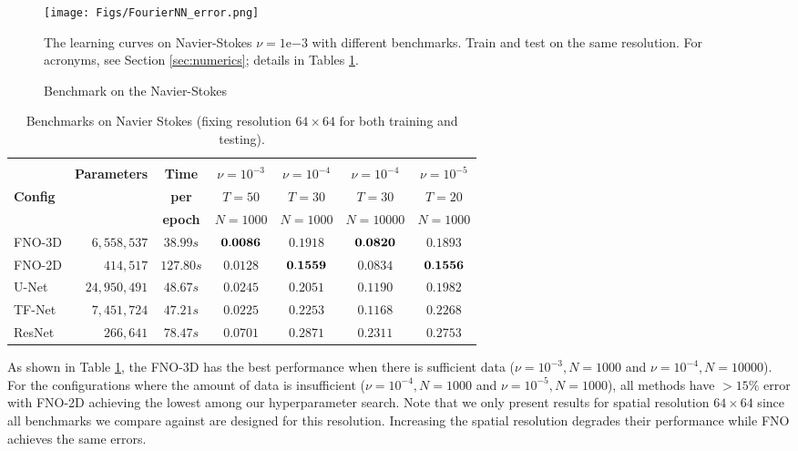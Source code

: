 \begin{figure}
    \centering
    \texttt{[image: Figs/FourierNN\_error.png]}
        \caption{Benchmark on the Navier-Stokes}
    \label{fig:ns-error}
    \small{The learning curves on Navier-Stokes $\nu=1\mathrm{e}{-3}$ with different benchmarks. Train and test on the same resolution.
    For acronyms, see Section \ref{sec:numerics}; details in Tables \ref{table:ns}.} 
\end{figure}

\begin{table}[ht]
\begin{center}
\begin{tabular}{l|rc|cccc}
\multicolumn{1}{c}{} 
&\multicolumn{1}{c}{}
&\multicolumn{1}{c}{} 
&\multicolumn{1}{c}{} 
&\multicolumn{1}{c}{}\\
 & {\bf Parameters}& {\bf Time}& $\nu=10^{-3}$ &$\nu=10^{-4}$ &$\nu=10^{-4}$ & $\nu=10^{-5}$\\
 {\bf Config}&& {\bf per} &$T=50$ &$T=30$ &$T=30$ & $T=20$\\
 && {\bf epoch} &$ N=1000$ &$ N=1000$ &$N=10000$ & $ N=1000$\\
\hline 
FNO-3D    & $6,558,537$ & $38.99s$ &${\bf 0.0086}$ &$0.1918$ &${\bf 0.0820}$  &$0.1893$ \\
FNO-2D    & $414,517$ & $127.80s$ &$0.0128 $ &${\bf 0.1559}$ &$0.0834$  &${\bf 0.1556}$ \\
U-Net       & $24,950,491$ & $48.67s$ &$0.0245 $ &$0.2051$ &$0.1190$  &$0.1982$ \\
TF-Net       & $7,451,724$ & $47.21s$ &$0.0225 $ &$0.2253$ &$0.1168$  &$0.2268$ \\
ResNet     &$266,641$ & $78.47s$ &$0.0701 $ &$0.2871$ &$0.2311$  &$0.2753$ \\
\hline 
\end{tabular}
\end{center}
\caption{Benchmarks on Navier Stokes (fixing resolution $64 \times 64$ for both training and testing).}
\label{table:ns}
\end{table}

As shown in Table \ref{table:ns}, the FNO-3D has the best performance when there is sufficient data ($\nu=10^{-3}, N=1000$ and $\nu=10^{-4}, N=10000$). For the configurations where the amount of data is insufficient ($\nu=10^{-4}, N=1000$ and $\nu=10^{-5}, N=1000$), all methods have $>15\%$ error with FNO-2D achieving the lowest among our hyperparameter search. Note that we only present results for spatial resolution $64 \times 64$ since all benchmarks we compare against are designed for this resolution. Increasing the spatial resolution degrades their performance while FNO achieves the same errors.  


